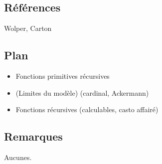 \documentclass[../../Agregation.tex]{subfiles}
\begin{document}

\dvts

\subsection{Références}

Wolper, Carton

\subsection{Plan}

\begin{itemize}
	\item Fonctions primitives récursives
	\item (Limites du modèle) (cardinal, Ackermann)
	\item Fonctions récursives (calculables, casto affairé)
\end{itemize}

\subsection{Remarques}

Aucunes.
\end{document}
